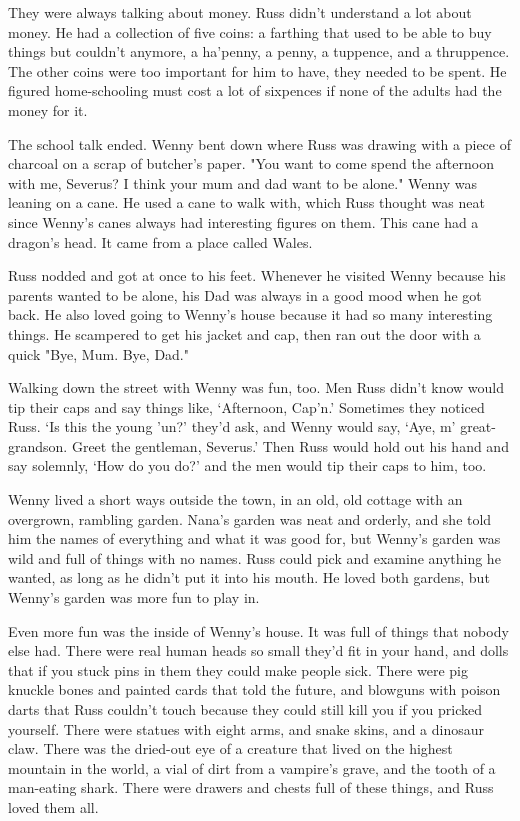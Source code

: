 They were always talking about money. Russ didn't understand a lot about money. He had a collection of five coins: a farthing that used to be able to buy things but couldn't anymore, a ha'penny, a penny, a tuppence, and a thruppence. The other coins were too important for him to have, they needed to be spent. He figured home-schooling must cost a lot of sixpences if none of the adults had the money for it.

The school talk ended. Wenny bent down where Russ was drawing with a piece of charcoal on a scrap of butcher's paper. "You want to come spend the afternoon with me, Severus? I think your mum and dad want to be alone." Wenny was leaning on a cane. He used a cane to walk with, which Russ thought was neat since Wenny's canes always had interesting figures on them. This cane had a dragon's head. It came from a place called Wales.

Russ nodded and got at once to his feet. Whenever he visited Wenny because his parents wanted to be alone, his Dad was always in a good mood when he got back. He also loved going to Wenny's house because it had so many interesting things. He scampered to get his jacket and cap, then ran out the door with a quick "Bye, Mum. Bye, Dad."

Walking down the street with Wenny was fun, too. Men Russ didn't know would tip their caps and say things like, `Afternoon, Cap'n.' Sometimes they noticed Russ. `Is this the young 'un?' they'd ask, and Wenny would say, `Aye, m' great-grandson. Greet the gentleman, Severus.' Then Russ would hold out his hand and say solemnly, `How do you do?' and the men would tip their caps to him, too.

Wenny lived a short ways outside the town, in an old, old cottage with an overgrown, rambling garden. Nana's garden was neat and orderly, and she told him the names of everything and what it was good for, but Wenny's garden was wild and full of things with no names. Russ could pick and examine anything he wanted, as long as he didn't put it into his mouth. He loved both gardens, but Wenny's garden was more fun to play in.

Even more fun was the inside of Wenny's house. It was full of things that nobody else had. There were real human heads so small they'd fit in your hand, and dolls that if you stuck pins in them they could make people sick. There were pig knuckle bones and painted cards that told the future, and blowguns with poison darts that Russ couldn't touch because they could still kill you if you pricked yourself. There were statues with eight arms, and snake skins, and a dinosaur claw. There was the dried-out eye of a creature that lived on the highest mountain in the world, a vial of dirt from a vampire's grave, and the tooth of a man-eating shark. There were drawers and chests full of these things, and Russ loved them all.

